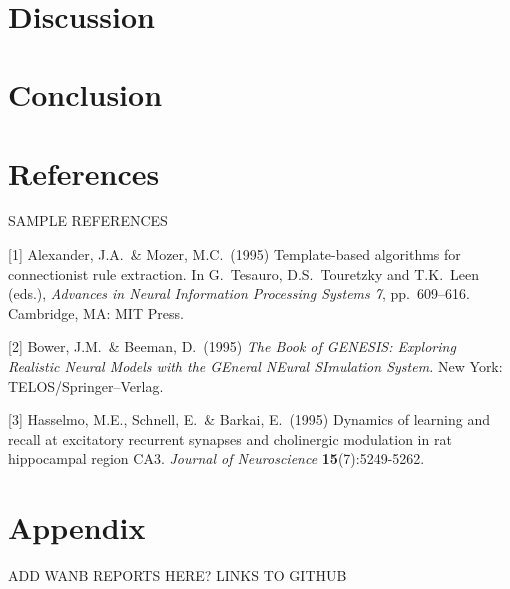 \documentclass{article}
\begin{document}
\
\section{Discussion}
\section{Conclusion}
\section*{References}

\medskip

{
\small

SAMPLE REFERENCES

[1] Alexander, J.A.\ \& Mozer, M.C.\ (1995) Template-based algorithms for
connectionist rule extraction. In G.\ Tesauro, D.S.\ Touretzky and T.K.\ Leen
(eds.), {\it Advances in Neural Information Processing Systems 7},
pp.\ 609--616. Cambridge, MA: MIT Press.

[2] Bower, J.M.\ \& Beeman, D.\ (1995) {\it The Book of GENESIS: Exploring
  Realistic Neural Models with the GEneral NEural SImulation System.}  New York:
TELOS/Springer--Verlag.

[3] Hasselmo, M.E., Schnell, E.\ \& Barkai, E.\ (1995) Dynamics of learning and
recall at excitatory recurrent synapses and cholinergic modulation in rat
hippocampal region CA3. {\it Journal of Neuroscience} {\bf 15}(7):5249-5262.
}


\appendix

\section{Appendix}

ADD WANB REPORTS HERE? LINKS TO GITHUB
\end{document}
